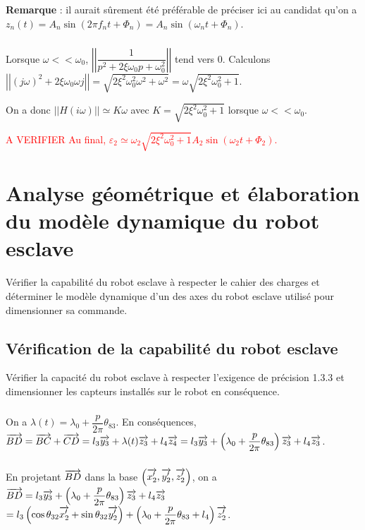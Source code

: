 \documentclass[10pt,fleqn]{article} %
\begin{document}
\textbf{Remarque }: il aurait sûrement été préférable de préciser ici au candidat qu'on a $z_n(t)=A_n\sin \left(2\pi f_n t + \Phi_n \right)=A_n\sin \left(\omega_n t + \Phi_n \right)$. 


\subparagraph{}	
Lorsque $\omega << \omega_0$, $\left|\left|  \dfrac{1}{p^2+2\xi\omega_0 p + \omega_0^2} \right|\right|$ tend vers 0. Calculons $\left|\left|  \left( j \omega \right) ^2+2\xi\omega_0  \omega j  \right|\right| =\sqrt{2\xi^2\omega_0^2 \omega^2 + \omega^2} =\omega \sqrt{2\xi^2\omega_0^2  + 1}$. 

On a donc $|| H\left( i\omega\right)|| \simeq K\omega $ avec $K=\sqrt{2\xi^2\omega_0^2  + 1}$ lorsque $\omega << \omega_0$.

\textcolor{red}{A VERIFIER Au final, $\varepsilon_2 \simeq \omega_2 \sqrt{2\xi^2\omega_0^2  + 1} A_2\sin \left(\omega_2 t + \Phi_2 \right) $.}

\subparagraph{}	


\section{Analyse géométrique et élaboration du modèle dynamique du robot esclave}

\begin{obj}
Vérifier la capabilité du robot esclave à respecter le cahier des charges et déterminer le modèle dynamique
d’un des axes du robot esclave utilisé pour dimensionner sa commande.
\end{obj}

\subsection{Vérification de la capabilité du robot esclave}
\begin{obj}
Vérifier la capacité du robot esclave à respecter l’exigence de précision 1.3.3 et dimensionner les
capteurs installés sur le robot en conséquence.
\end{obj}


\subparagraph{}%
\subparagraph{}%
On a $\lambda(t)=\lambda_0 + \dfrac{p}{2\pi} \theta_{83}$. 
En conséquences, $\overrightarrow{BD}=\overrightarrow{BC}+\overrightarrow{CD}=l_3\overrightarrow{y_3}+\lambda(t)\overrightarrow{z_3}+l_4\overrightarrow{z_4}
=l_3\overrightarrow{y_3}+\left( \lambda_0 + \dfrac{p}{2\pi} \theta_{83} \right)\overrightarrow{z_3}+l_4\overrightarrow{z_3}$.


\subparagraph{}%
En projetant $\overrightarrow{BD}$ dans la base $\left(\overrightarrow{x_2'},\overrightarrow{y_2'},\overrightarrow{z_2'} \right)$, on a 
 $\overrightarrow{BD}=l_3\overrightarrow{y_3}+\left( \lambda_0 + \dfrac{p}{2\pi} \theta_{83} \right)\overrightarrow{z_3}+l_4\overrightarrow{z_3}$
 $ =l_3\left( \cos \theta_{32} \overrightarrow{x_2'} + \sin\theta_{32} \overrightarrow{y_2'}  \right)+\left( \lambda_0 + \dfrac{p}{2\pi} \theta_{83} +l_4\right)\overrightarrow{z_2'}$.
 
\end{document}
